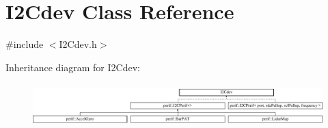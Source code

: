 \hypertarget{classI2Cdev}{}\section{I2\+Cdev Class Reference}
\label{classI2Cdev}


{\ttfamily \#include $<$I2\+Cdev.\+h$>$}

Inheritance diagram for I2\+Cdev\+:\begin{figure}[H]
\begin{center}
\leavevmode
\includegraphics[height=1.676647cm]{classI2Cdev}
\end{center}
\end{figure}
